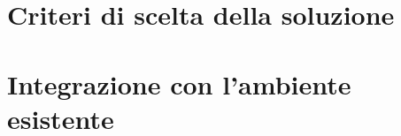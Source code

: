 \section{Criteri di scelta della soluzione}
\label{sec:criteri-scelta-soluzione}


\section{Integrazione con l'ambiente esistente}
\label{sec:integrazione-ambiente-esistente}








